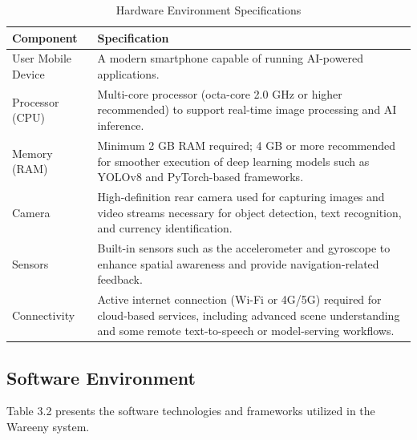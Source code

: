 \documentclass[12pt,a4paper]{report}
\begin{document}
\begin{table}[h]
\centering
\caption{Hardware Environment Specifications}
\begin{tabularx}{\textwidth}{|>{\raggedright\arraybackslash}p{}|>{\raggedright\arraybackslash}X|}
\hline
\textbf{Component} & \textbf{Specification} \\
\hline
User Mobile Device & A modern smartphone capable of running AI-powered applications. \\
\hline
Processor (CPU) & Multi-core processor (octa-core 2.0 GHz or higher recommended) to support real-time image processing and AI inference. \\
\hline
Memory (RAM) & Minimum 2 GB RAM required; 4 GB or more recommended for smoother execution of deep learning models such as YOLOv8 and PyTorch-based frameworks. \\
\hline
Camera & High-definition rear camera used for capturing images and video streams necessary for object detection, text recognition, and currency identification. \\
\hline
Sensors & Built-in sensors such as the accelerometer and gyroscope to enhance spatial awareness and provide navigation-related feedback. \\
\hline
Connectivity & Active internet connection (Wi-Fi or 4G/5G) required for cloud-based services, including advanced scene understanding and some remote text-to-speech or model-serving workflows. \\
\hline
\end{tabularx}
\end{table}

\subsection{Software Environment}

Table 3.2 presents the software technologies and frameworks utilized in the Wareeny system.
\end{document}
